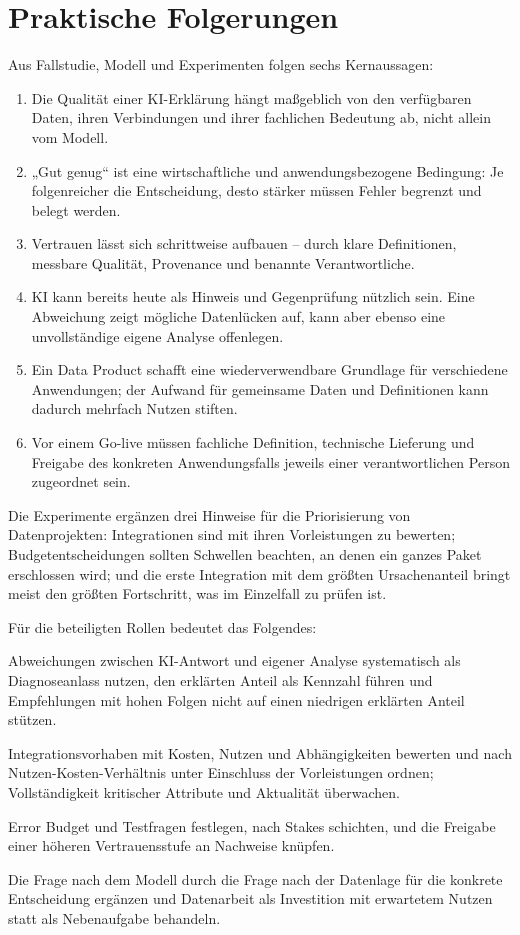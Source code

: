 \documentclass[a4paper,12pt,twoside]{report}
\theoremstyle{definition}
\begin{document}
\section{Praktische Folgerungen}
Aus Fallstudie, Modell und Experimenten folgen sechs Kernaussagen:
\begin{enumerate}
\item Die Qualität einer KI-Erklärung hängt maßgeblich von den verfügbaren Daten, ihren Verbindungen und ihrer fachlichen Bedeutung ab, nicht allein vom Modell.
\item „Gut genug“ ist eine wirtschaftliche und anwendungsbezogene Bedingung: Je folgenreicher die Entscheidung, desto stärker müssen Fehler begrenzt und belegt werden.
\item Vertrauen lässt sich schrittweise aufbauen – durch klare Definitionen, messbare Qualität, Provenance und benannte Verantwortliche.
\item KI kann bereits heute als Hinweis und Gegenprüfung nützlich sein. Eine Abweichung zeigt mögliche Datenlücken auf, kann aber ebenso eine unvollständige eigene Analyse offenlegen.
\item Ein Data Product schafft eine wiederverwendbare Grundlage für verschiedene Anwendungen; der Aufwand für gemeinsame Daten und Definitionen kann dadurch mehrfach Nutzen stiften.
\item Vor einem Go-live müssen fachliche Definition, technische Lieferung und Freigabe des konkreten Anwendungsfalls jeweils einer verantwortlichen Person zugeordnet sein.
\end{enumerate}
Die Experimente ergänzen drei Hinweise für die Priorisierung von Datenprojekten: Integrationen sind mit ihren Vorleistungen zu bewerten; Budgetentscheidungen sollten Schwellen beachten, an denen ein ganzes Paket erschlossen wird; und die erste Integration mit dem größten Ursachenanteil bringt meist den größten Fortschritt, was im Einzelfall zu prüfen ist.

Für die beteiligten Rollen bedeutet das Folgendes:
\begin{description}[style=nextline]
\item[Controlling und Fachbereich.] Abweichungen zwischen KI-Antwort und eigener Analyse systematisch als Diagnoseanlass nutzen, den erklärten Anteil als Kennzahl führen und Empfehlungen mit hohen Folgen nicht auf einen niedrigen erklärten Anteil stützen.
\item[Data Product Owner.] Integrationsvorhaben mit Kosten, Nutzen und Abhängigkeiten bewerten und nach Nutzen-Kosten-Verhältnis unter Einschluss der Vorleistungen ordnen; Vollständigkeit kritischer Attribute und Aktualität überwachen.
\item[Use-Case Owner.] Error Budget und Testfragen festlegen, nach Stakes schichten, und die Freigabe einer höheren Vertrauensstufe an Nachweise knüpfen.
\item[Management.] Die Frage nach dem Modell durch die Frage nach der Datenlage für die konkrete Entscheidung ergänzen und Datenarbeit als Investition mit erwartetem Nutzen statt als Nebenaufgabe behandeln.
\end{description}
\end{document}
